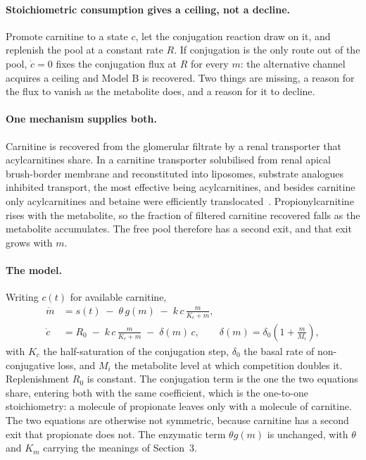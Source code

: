 \paragraph{Stoichiometric consumption gives a ceiling, not a decline.} Promote carnitine to
a state $c$, let the conjugation reaction draw on it, and replenish the pool at a constant
rate $R$. If conjugation is the only route out of the pool, $\dot c = 0$ fixes the
conjugation flux at $R$ for every $m$: the alternative channel acquires a ceiling and Model
B is recovered. Two things are missing, a reason for the flux to vanish as the metabolite
does, and a reason for it to decline.

\paragraph{One mechanism supplies both.} Carnitine is recovered from the glomerular filtrate
by a renal transporter that acylcarnitines share. In a carnitine transporter solubilised
from renal apical brush-border membrane and reconstituted into liposomes, substrate
analogues inhibited transport, the most effective being acylcarnitines, and besides
carnitine only acylcarnitines and betaine were efficiently
translocated~\cite{octn2_renal_transport}. %
Propionylcarnitine rises with the metabolite, so the fraction of filtered carnitine
recovered falls as the metabolite accumulates. The free pool therefore has a second exit,
and that exit grows with $m$.

\paragraph{The model.} Writing $c(t)$ for available carnitine,
\begin{equation}
\begin{aligned}
\dot m &= s(t) \;-\; \theta\, g(m) \;-\; k\, c\, \frac{m}{K_c + m}, \\[2pt]
\dot c &= R_0 \;-\; k\, c\, \frac{m}{K_c + m} \;-\; \delta(m)\, c,
\qquad \delta(m) = \delta_0\left(1 + \frac{m}{M_i}\right),
\end{aligned}
\label{eq:C}
\end{equation}
with $K_c$ the half-saturation of the conjugation step, $\delta_0$ the basal rate of
non-conjugative loss, and $M_i$ the metabolite level at which competition doubles it.
Replenishment $R_0$ is constant. The conjugation term is the one the two equations share,
entering both with the same coefficient, which is the one-to-one stoichiometry: a molecule
of propionate leaves only with a molecule of carnitine. The two equations are otherwise not
symmetric, because carnitine has a second exit that propionate does not. The enzymatic term
$\theta g(m)$ is unchanged, with $\theta$ and $K_m$ carrying the meanings of Section~3.

